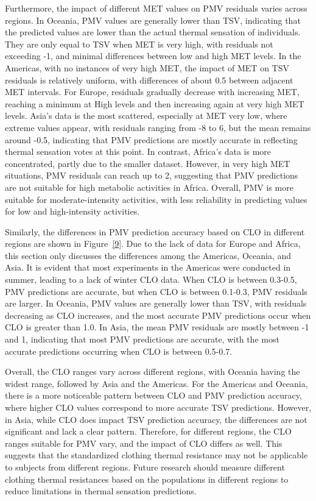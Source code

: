 \documentclass[final,3p,times,12pt]{elsarticle}
\begin{document}
Furthermore, the impact of different MET values on PMV residuals varies across regions. In Oceania, PMV values are generally lower than TSV, indicating that the predicted values are lower than the actual thermal sensation of individuals. They are only equal to TSV when MET is very high, with residuals not exceeding -1, and minimal differences between low and high MET levels. In the Americas, with no instances of very high MET, the impact of MET on TSV residuals is relatively uniform, with differences of about 0.5 between adjacent MET intervals. For Europe, residuals gradually decrease with increasing MET, reaching a minimum at High levels and then increasing again at very high MET levels. Asia's data is the most scattered, especially at MET very low, where extreme values appear, with residuals ranging from -8 to 6, but the mean remains around -0.5, indicating that PMV predictions are mostly accurate in reflecting thermal sensation votes at this point. In contrast, Africa's data is more concentrated, partly due to the smaller dataset. However, in very high MET situations, PMV residuals can reach up to 2, suggesting that PMV predictions are not suitable for high metabolic activities in Africa. Overall, PMV is more suitable for moderate-intensity activities, with less reliability in predicting values for low and high-intensity activities.

Similarly, the differences in PMV prediction accuracy based on CLO in different regions are shown in Figure~\ref{9}. Due to the lack of data for Europe and Africa, this section only discusses the differences among the Americas, Oceania, and Asia. It is evident that most experiments in the Americas were conducted in summer, leading to a lack of winter CLO data. When CLO is between 0.3-0.5, PMV predictions are accurate, but when CLO is between 0.1-0.3, PMV residuals are larger. In Oceania, PMV values are generally lower than TSV, with residuals decreasing as CLO increases, and the most accurate PMV predictions occur when CLO is greater than 1.0. In Asia, the mean PMV residuals are mostly between -1 and 1, indicating that most PMV predictions are accurate, with the most accurate predictions occurring when CLO is between 0.5-0.7.

Overall, the CLO ranges vary across different regions, with Oceania having the widest range, followed by Asia and the Americas. For the Americas and Oceania, there is a more noticeable pattern between CLO and PMV prediction accuracy, where higher CLO values correspond to more accurate TSV predictions. However, in Asia, while CLO does impact TSV prediction accuracy, the differences are not significant and lack a clear pattern. Therefore, for different regions, the CLO ranges suitable for PMV vary, and the impact of CLO differs as well. This suggests that the standardized clothing thermal resistance may not be applicable to subjects from different regions. Future research should measure different clothing thermal resistances based on the populations in different regions to reduce limitations in thermal sensation predictions.
\end{document}
